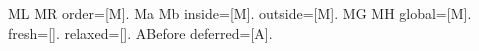 \documentclass{article}
\begin{document}
\makeatletter
\def\sample{M}
\ltx@GlobalPrependToMacro\sample{L}
\ltx@GlobalAppendToMacro\sample{R}
order=[\sample].
{\ltx@LocalPrependToMacro\sample{a}
 \ltx@LocalAppendToMacro\sample{b}
 inside=[\sample].}
outside=[\sample].
{\ltx@GlobalPrependToMacro\sample{G}
 \ltx@GlobalAppendToMacro\sample{H}}
global=[\sample].
\ltx@GlobalAppendToMacro{}
fresh=[\fresh].
\let\relaxed\relax
\ltx@LocalPrependToMacro{\relaxed}{P}
relaxed=[\relaxed].
\def\word{Before}
\def\deferred{A}
\ltx@GlobalAppendToMacro\deferred{\word}
\def\word{After}
deferred=[\deferred].
\makeatother
\end{document}
